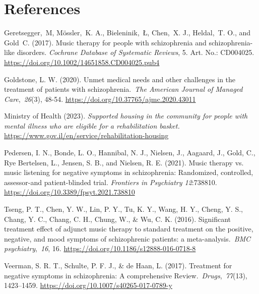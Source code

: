 \documentclass[authordate, empirical]{jote-new-article}
\begin{document}
\section{References}



Geretsegger, M, Mössler, K. A., Bieleninik, Ł, Chen, X. J., Heldal, T. O., and Gold C. (2017). Music therapy for people with schizophrenia and schizophrenia-like disorders.\emph{ Cochrane Database of Systematic Reviews}, 5. Art. No.: CD004025. \href{https://doi.org/10.1002/14651858.CD004025.pub4}{https://doi.org/10.1002/14651858.CD004025.pub4}



Goldstone, L. W. (2020). Unmet medical needs and other challenges in the treatment of patients with schizophrenia. \emph{The American Journal of Managed Care}, \emph{26}(3), 48-54. \href{https://doi.org/10.37765/ajmc.2020.43011}{https://doi.org/10.37765/ajmc.2020.43011}



Ministry of Health (2023). \emph{Supported housing in the community for people with mental illness who are eligible for a rehabilitation basket. }\href{https://www.gov.il/en/service/rehabilitation-housing}{https://www.gov.il/en/service/rehabilitation-housing}



Pedersen, I. N., Bonde, L. O., Hannibal, N. J., Nielsen, J., Aagaard, J., Gold, C., Rye Bertelsen, L., Jensen, S. B., and Nielsen, R. E. (2021). Music therapy vs. music listening for negative symptoms in schizophrenia: Randomized, controlled, assessor-and patient-blinded trial. \emph{Frontiers in Psychiatry 12}:738810. \href{https://doi.org/10.3389/fpsyt.2021.738810}{https://doi.org/10.3389/fpsyt.2021.738810}



Tseng, P. T., Chen, Y. W., Lin, P. Y., Tu, K. Y., Wang, H. Y., Cheng, Y. S., Chang, Y. C., Chang, C. H., Chung, W., \& Wu, C. K. (2016). Significant treatment effect of adjunct music therapy to standard treatment on the positive, negative, and mood symptoms of schizophrenic patients: a meta-analysis. \emph{BMC psychiatry}, \emph{16}, 16. \href{https://doi.org/10.1186/s12888-016-0718-8}{https://doi.org/10.1186/s12888-016-0718-8}



Veerman, S. R. T., Schulte, P. F. J., \& de Haan, L. (2017). Treatment for negative symptoms in schizophrenia: A comprehensive Review. \emph{Drugs}, \emph{77}(13), 1423--1459. \href{https://doi.org/10.1007/s40265-017-0789-y}{https://doi.org/10.1007/s40265-017-0789-y}
\end{document}
